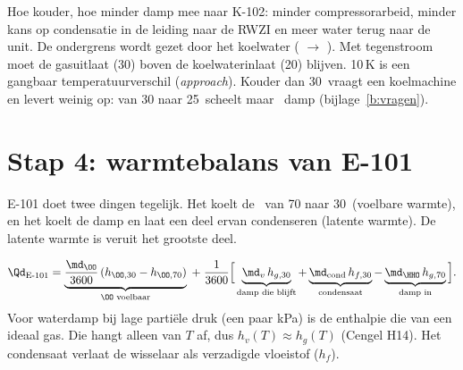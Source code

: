 \begin{waarom}
Hoe kouder, hoe minder damp mee naar K-102: minder compressorarbeid, minder kans op condensatie in de
leiding naar de RWZI en meer water terug naar de unit. De ondergrens wordt gezet door het koelwater
( $\rightarrow$ \degC). Met tegenstroom moet de gasuitlaat (30\degC)
boven de koelwaterinlaat (20\degC) blijven. 10\,K is een gangbaar temperatuurverschil (\emph{approach}).
Kouder dan 30\degC\ vraagt een koelmachine en levert weinig op: van 30 naar 25\degC\ scheelt maar
\kgh\ damp (bijlage~\ref{b:vragen}).
\end{waarom}

\section{Stap 4: warmtebalans van E-101}
E-101 doet twee dingen tegelijk. Het koelt de \OO\ van 70 naar 30\degC\ (voelbare warmte), en het koelt de damp en
laat een deel ervan condenseren (latente warmte). De latente warmte is veruit het grootste deel.
\begin{methode}
\[
\Qd_{\text{E-101}} = \underbrace{\frac{\md_{\OO}}{3600}\,(h_{\OO,30}-h_{\OO,70})}_{\text{\OO\ voelbaar}}
\;+\; \frac{1}{3600}\Big[\underbrace{\md_v\,h_{g,30}}_{\text{damp die blijft}} + \underbrace{\md_\mathrm{cond}\,h_{f,30}}_{\text{condensaat}}
- \underbrace{\md_{\HHO}\,h_{g,70}}_{\text{damp in}}\Big].
\]
Voor waterdamp bij lage partiële druk (een paar kPa) is de enthalpie die van een ideaal gas. Die hangt alleen van
$T$ af, dus $h_v(T) \approx h_g(T)$ (Cengel H14). Het condensaat verlaat de wisselaar als verzadigde vloeistof
($h_f$).
\end{methode}
